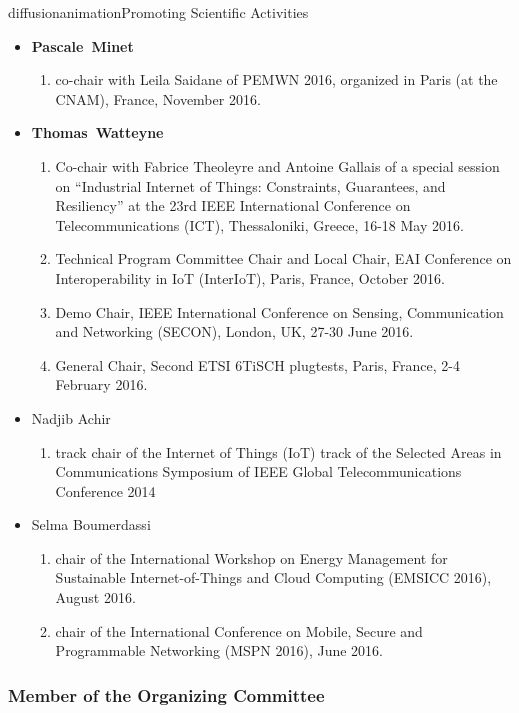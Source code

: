 \documentclass{ra2016}
\newcommand{\pascale}          {\textbf{Pascale~Minet}}
\newcommand{\thomas}           {\textbf{Thomas~Watteyne}}
\begin{document}
\begin{module}{diffusion}{animation}{Promoting Scientific Activities}
\begin{itemize}
    \item \pascale
        \begin{enumerate}
            \item co-chair with Leila Saidane of PEMWN 2016, organized in Paris (at the CNAM), France, November 2016.
        \end{enumerate}
    \item \thomas
        \begin{enumerate}
            \item Co-chair with Fabrice Theoleyre and Antoine Gallais of a special session on ``Industrial Internet of Things: Constraints, Guarantees, and Resiliency'' at the 23rd IEEE International Conference on Telecommunications (ICT), Thessaloniki, Greece, 16-18 May 2016.
            \item Technical Program Committee Chair and Local Chair,  EAI Conference on Interoperability in IoT (InterIoT), Paris, France, October 2016.
            \item Demo Chair, IEEE International Conference on Sensing, Communication and Networking (SECON), London, UK, 27-30 June 2016.
            \item General Chair, Second ETSI 6TiSCH plugtests, Paris, France, 2-4 February 2016.
        \end{enumerate}
    \item Nadjib Achir
        \begin{enumerate}
            \item track chair of the Internet of Things (IoT) track of the Selected Areas in Communications Symposium of IEEE Global Telecommunications Conference 2014
        \end{enumerate}
    \item Selma Boumerdassi
        \begin{enumerate}
         \item chair of the International Workshop on Energy Management for Sustainable Internet-of-Things and Cloud Computing (EMSICC 2016), August 2016.
         \item chair of the International Conference on Mobile, Secure and Programmable Networking (MSPN 2016), June 2016.
        \end{enumerate}
\end{itemize}

\subsubsection{Member of the Organizing Committee}


\end{module}
\end{document}
